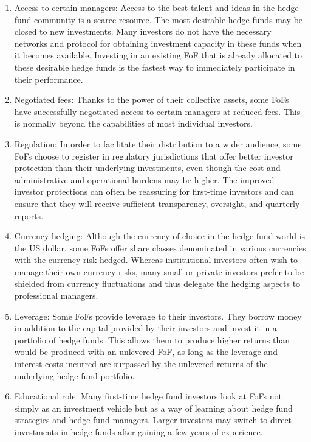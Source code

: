 \documentclass[11pt]{article}
\begin{document}
\begin{enumerate}
  \item Access to certain managers: Access to the best talent and ideas in the hedge fund community is a scarce resource. The most desirable hedge funds may be closed to new investments. Many investors do not have the necessary networks and protocol for obtaining investment capacity in these funds when it becomes available. Investing in an existing FoF that is already allocated to these desirable hedge funds is the fastest way to immediately participate in their performance.

  \item Negotiated fees: Thanks to the power of their collective assets, some FoFs have successfully negotiated access to certain managers at reduced fees. This is normally beyond the capabilities of most individual investors.

  \item Regulation: In order to facilitate their distribution to a wider audience, some FoFs choose to register in regulatory jurisdictions that offer better investor protection than their underlying investments, even though the cost and administrative and operational burdens may be higher. The improved investor protections can often be reassuring for first-time investors and can ensure that they will receive sufficient transparency, oversight, and quarterly reports.

  \item Currency hedging: Although the currency of choice in the hedge fund world is the US dollar, some FoFs offer share classes denominated in various currencies with the currency risk hedged. Whereas institutional investors often wish to manage their own currency risks, many small or private investors prefer to be\\
shielded from currency fluctuations and thus delegate the hedging aspects to professional managers.

  \item Leverage: Some FoFs provide leverage to their investors. They borrow money in addition to the capital provided by their investors and invest it in a portfolio of hedge funds. This allows them to produce higher returns than would be produced with an unlevered FoF, as long as the leverage and interest costs incurred are surpassed by the unlevered returns of the underlying hedge fund portfolio.

  \item Educational role: Many first-time hedge fund investors look at FoFs not simply as an investment vehicle but as a way of learning about hedge fund strategies and hedge fund managers. Larger investors may switch to direct investments in hedge funds after gaining a few years of experience.

\end{enumerate}
\end{document}

